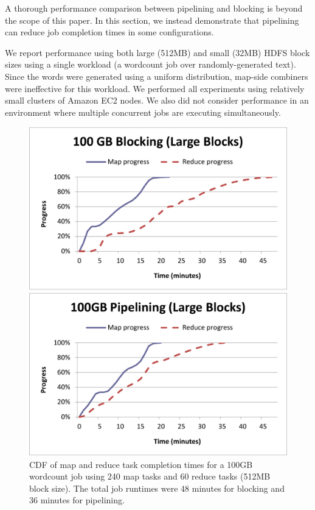 A thorough performance comparison between pipelining and blocking is beyond the
scope of this paper. In this section, we instead demonstrate that pipelining can
reduce job completion times in some configurations.

We report performance using both large (512MB) and small (32MB) HDFS block sizes
using a single workload (a wordcount job over randomly-generated text). Since
the words were generated using a uniform distribution, map-side combiners were
ineffective for this workload. We performed all experiments using relatively
small clusters of Amazon EC2 nodes. We also did not consider performance in an
environment where multiple concurrent jobs are executing simultaneously.

\begin{figure}[t]
\begin{minipage}{0.5\linewidth}
  \centering
        \includegraphics[width=0.95\linewidth]{figures/wc_100gb_240m60r_blocking}
\end{minipage}
\begin{minipage}{0.5\linewidth}
  \centering
        \includegraphics[width=0.95\linewidth]{figures/wc_100gb_240m60r_pipeline}
\end{minipage}
\caption{CDF of map and reduce task completion times for a 100GB wordcount job
  using 240 map tasks and 60 reduce tasks (512MB block size). The total job
  runtimes were 48 minutes for blocking and 36 minutes for pipelining.}
\label{fig:wc4}
\end{figure}

